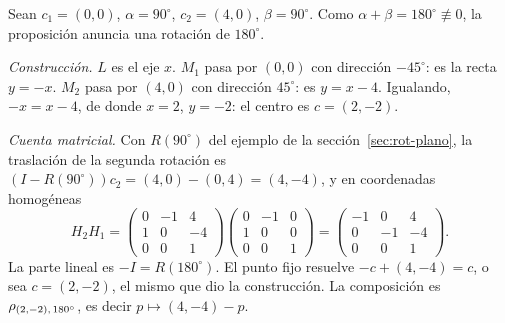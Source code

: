 \begin{center}
\end{center}

\begin{ejemplo}\label{ej:composicion-centros}
Sean \(c_1=(0,0)\), \(\alpha=90^\circ\), \(c_2=(4,0)\), \(\beta=90^\circ\). Como
\(\alpha+\beta=180^\circ\not\equiv0\), la proposición anuncia una rotación de \(180^\circ\).

\emph{Construcción.} \(L\) es el eje \(x\). \(M_1\) pasa por \((0,0)\) con dirección
\(-45^\circ\): es la recta \(y=-x\). \(M_2\) pasa por \((4,0)\) con dirección \(45^\circ\):
es \(y=x-4\). Igualando, \(-x=x-4\), de donde \(x=2\), \(y=-2\): el centro es \(c=(2,-2)\).

\emph{Cuenta matricial.} Con \(R(90^\circ)\) del ejemplo de la sección~\ref{sec:rot-plano}, la
traslación de la segunda rotación es \((I-R(90^\circ))c_2=(4,0)-(0,4)=(4,-4)\), y en
coordenadas homogéneas
\[
H_2H_1=
\begin{pmatrix}0&-1&4\\1&0&-4\\0&0&1\end{pmatrix}
\begin{pmatrix}0&-1&0\\1&0&0\\0&0&1\end{pmatrix}
=\begin{pmatrix}-1&0&4\\0&-1&-4\\0&0&1\end{pmatrix}.
\]
La parte lineal es \(-I=R(180^\circ)\). El punto fijo resuelve \(-c+(4,-4)=c\), o sea
\(c=(2,-2)\), el mismo que dio la construcción. La composición es
\(\rho_{(2,-2),\,180^\circ}\), es decir \(p\mapsto(4,-4)-p\).
\end{ejemplo}

